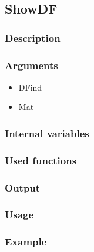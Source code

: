 \subsection{ShowDF}\label{ShowDF}
\subsubsection{Description}
\subsubsection{Arguments}

\begin{itemize}
\item DFind
\item Mat
\end{itemize}
\subsubsection{Internal variables}
\subsubsection{Used functions}
\subsubsection{Output}
\subsubsection{Usage}
\subsubsection{Example}

